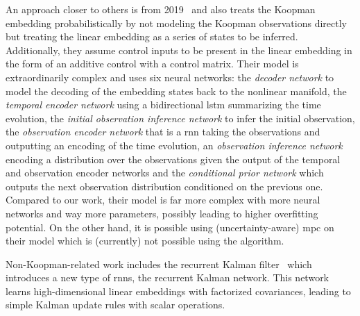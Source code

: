 An approach closer to others is from 2019~\cite{mortonDeepVariationalKoopman2019a} and also treats the Koopman embedding probabilistically by not modeling the Koopman observations directly but treating the linear embedding as a series of states to be inferred. Additionally, they assume control inputs to be present in the linear embedding in the form of an additive control with a control matrix. Their model is extraordinarily complex and uses six neural networks: the \emph{decoder network} to model the decoding of the embedding states back to the nonlinear manifold, the \emph{temporal encoder network} using a bidirectional \ac{lstm} summarizing the time evolution, the \emph{initial observation inference network} to infer the initial observation, the \emph{observation encoder network} that is a \ac{rnn} taking the observations and outputting an encoding of the time evolution, an \emph{observation inference network} encoding a distribution over the observations given the output of the temporal and observation encoder networks and the \emph{conditional prior network} which outputs the next observation distribution conditioned on the previous one. Compared to our work, their model is far more complex with more neural networks and way more parameters, possibly leading to higher overfitting potential. On the other hand, it is possible using (uncertainty-aware) \ac{mpc} on their model which is (currently) not possible using the \algname algorithm.

Non-Koopman-related work includes the recurrent Kalman filter~\cite{beckerRecurrentKalmanNetworks2019a} which introduces a new type of \acp{rnn}, the recurrent Kalman network. This network learns high-dimensional linear embeddings with factorized covariances, leading to simple Kalman update rules with scalar operations.

